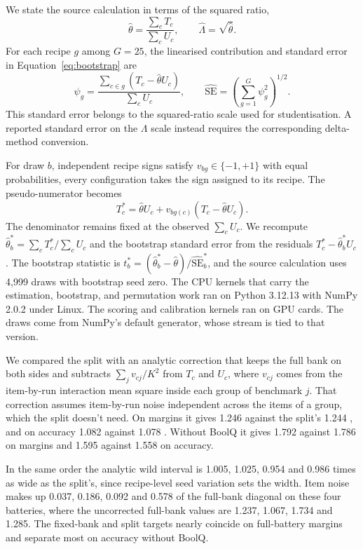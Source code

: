 We state the source calculation in terms of the squared ratio,
\[
\widehat\theta=\frac{\sum_cT_c}{\sum_cU_c},\qquad
\widehat\Lambda=\sqrt{\widehat\theta}. \]
For each recipe $g$ among $G=25$, the linearised contribution and standard error in Equation~\ref{eq:bootstrap} are
\begin{equation}
\psi_g=\frac{\sum_{c\in g}(T_c-\widehat\theta U_c)}{\sum_cU_c},
\qquad
\widehat{\mathrm{SE}}=\left(\sum_{g=1}^{G}\psi_g^2\right)^{1/2}. \label{eq:bootstrap}
\end{equation}
This standard error belongs to the squared-ratio scale used for studentisation. A reported standard error on the $\Lambda$ scale instead requires the corresponding delta-method conversion.

For draw $b$, independent recipe signs satisfy $v_{bg}\in\{-1,+1\}$ with equal probabilities, every configuration takes the sign assigned to its recipe. The pseudo-numerator becomes \[ T_c^*=\widehat\theta U_c+v_{bg(c)}(T_c-\widehat\theta U_c). \]
The denominator remains fixed at the observed $\sum_cU_c$. We recompute $\widehat\theta_b^*=\sum_cT_c^*/\sum_cU_c$ and the bootstrap standard error from the residuals $T_c^*-\widehat\theta_b^*U_c$. The bootstrap statistic is $t_b^*=(\widehat\theta_b^*-\widehat\theta)/\widehat{\mathrm{SE}}_b^*$, and the source calculation uses 4,999 draws with bootstrap seed zero. The CPU kernels that carry the estimation, bootstrap, and permutation work ran on Python 3.12.13 with NumPy 2.0.2 under Linux. The scoring and calibration kernels ran on GPU cards. The draws come from NumPy's default generator, whose stream is tied to that version.

We compared the split with an analytic correction that keeps the full bank on both sides and subtracts $\sum_j v_{cj}/K^2$ from $T_c$ and $U_c$, where $v_{cj}$ comes from the item-by-run interaction mean square inside each group of benchmark $j$. That correction assumes item-by-run noise independent across the items of a group, which the split doesn't need. On margins it gives 1.246  against the split's 1.244 , and on accuracy 1.082  against 1.078 . Without BoolQ it gives 1.792  against 1.786 on margins and 1.595  against 1.558 on accuracy.

In the same order the analytic wild interval is 1.005, 1.025, 0.954 and 0.986 times as wide as the split's, since recipe-level seed variation sets the width. Item noise makes up 0.037, 0.186, 0.092 and 0.578 of the full-bank diagonal on these four batteries, where the uncorrected full-bank values are 1.237, 1.067, 1.734 and 1.285. The fixed-bank and split targets nearly coincide on full-battery margins and separate most on accuracy without BoolQ.

